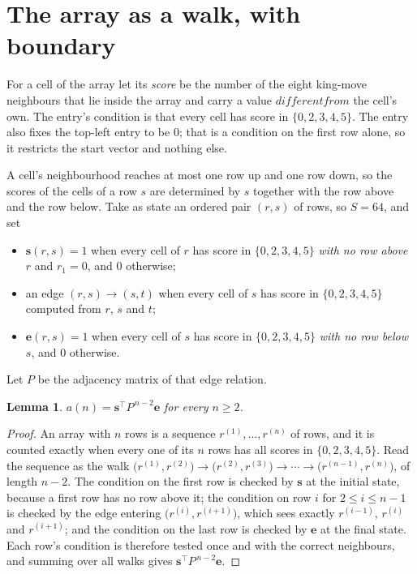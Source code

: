 \documentclass[11pt,a4paper]{article}
\theoremstyle{plain}
\newtheorem{lemma}[theorem]{Lemma}
\theoremstyle{definition}
\begin{document}
\section{The array as a walk, with boundary}

For a cell of the array let its \emph{score} be the number of the eight king-move neighbours that lie inside
the array and carry a value $different from$ the cell's own. The entry's condition is that every cell
has score in $\{0,2,3,4,5\}$. The entry also fixes the top-left entry to be $0$; that is a condition on the first row alone, so it restricts the start vector and nothing else.

A cell's neighbourhood reaches at most one row up and one row down, so the scores of the
cells of a row $s$ are determined by $s$ together with the row above and the row below.
Take as state an ordered pair $(r,s)$ of rows, so $S=64$, and set
\begin{itemize}
\item $\mathbf{s}(r,s)=1$ when every cell of $r$ has score in $\{0,2,3,4,5\}$ \emph{with no row
above $r$} and $r_1=0$, and $0$ otherwise;
\item an edge $(r,s)\to(s,t)$ when every cell of $s$ has score in $\{0,2,3,4,5\}$ computed from
$r$, $s$ and $t$;
\item $\mathbf{e}(r,s)=1$ when every cell of $s$ has score in $\{0,2,3,4,5\}$ \emph{with no row
below $s$}, and $0$ otherwise.
\end{itemize}
Let $P$ be the adjacency matrix of that edge relation.

\begin{lemma}\label{lem:walk}
$a(n)=\mathbf{s}^{\!\top}P^{\,n-2}\mathbf{e}$ for every $n\ge2$.
\end{lemma}

\begin{proof}
An array with $n$ rows is a sequence $r^{(1)},\dots,r^{(n)}$ of rows, and it is counted
exactly when every one of its $n$ rows has all scores in $\{0,2,3,4,5\}$. Read the sequence as the
walk $\bigl(r^{(1)},r^{(2)}\bigr)\to\bigl(r^{(2)},r^{(3)}\bigr)\to\cdots\to
\bigl(r^{(n-1)},r^{(n)}\bigr)$, of length $n-2$. The condition on the first row is
checked by $\mathbf{s}$ at the initial state, because a first row has no row above it; the
condition on row $i$ for $2\le i\le n-1$ is checked by the edge entering
$\bigl(r^{(i)},r^{(i+1)}\bigr)$, which sees exactly $r^{(i-1)}$, $r^{(i)}$ and
$r^{(i+1)}$; and the condition on the last row is checked by $\mathbf{e}$ at the final
state. Each row's condition is therefore tested once and with the correct neighbours, and
summing over all walks gives $\mathbf{s}^{\!\top}P^{\,n-2}\mathbf{e}$.
\end{proof}
\end{document}
